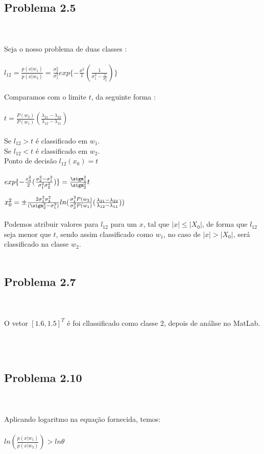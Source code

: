\documentclass[a4paper, 12pt]{article}
\begin{document}
\subsection{Problema 2.5}
\\ \\ 
Seja o nosso problema de duas classes :
\\ \\
$l_{12} = \frac{p(x|w_1)}{p(x|w_2)} = \frac{\sigma^2_2}{\sigma^2_1} exp \{ -\frac{x^2}{1}(\frac{1}{\sigma^2_1 - \frac{1}{\sigma^2_2}} )\}$
\\ \\
Comparamos com o limite $t$, da seguinte forma :
\\ \\
$t = \frac{P(w_2)}{P(w_1)}(\frac{\lambda_{21} - \lambda_{22}}{\lambda_{12}-\lambda_{11}})$
\\ \\
Se $l_{12}>t$ é classificado em $w_1$.\\
Se $l_{12}<t$ é classificado em $w_2$.\\
Ponto de decisão $l_{12}(x_0)=t$
\\ \\ 
$exp\{-\frac{x^2_0}{2} ( \frac{\sigma^2_2 - \sigma^2_1}{\sigma^2_1\sigma^2_2})\} = \frac{\sigm^2_1}{\sigm^2_2}t$

$x^2_0 = \pm \frac{2\sigma^2_1\sigma^2_2}{(\sigm^2_2 - \sigma^2_1)} ln (\frac{\sigma^2_1P(w_2)}{\sigma^2_2 P(w_1)} (\frac{\lambda_{21} - \lambda_{22}}{\lambda_{12}-\lambda_{11}}))$
\\ \\
Podemos atribuir valores para $l_{12}$ para um $x$, tal que $|x|\leq|X_0|$, de forma que $l_{12}$ seja menor que $t$, sendo assim classificado como $w_1$, no caso de $|x|>|X_0|$, será classificado na classe $w_2$.
\\ \\
\subsection{Problema 2.7}
\\ \\
O vetor $[1.6,1.5]^T$ é foi cllassificado como classe 2, depois de análise no MatLab.

\\ \\
\subsection{Problema 2.10}
\\ \\
Aplicando logaritmo na equação fornecida, temos:
\\ \\
$ln (\frac{p(x|w_1)}{p(x|w_2)}) > ln \theta$
\end{document}
